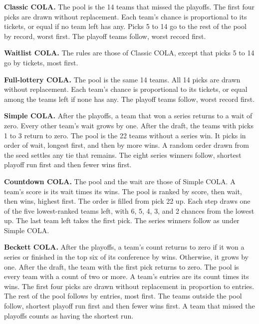 \documentclass[11pt,letterpaper]{article}
\begin{document}
\textbf{Classic COLA.} The pool is the 14 teams that missed the playoffs. The first four picks are drawn without replacement. Each team's chance is proportional to its tickets, or equal if no team left has any. Picks 5 to 14 go to the rest of the pool by record, worst first. The playoff teams follow, worst record first.

\textbf{Waitlist COLA.} The rules are those of Classic COLA, except that picks 5 to 14 go by tickets, most first.

\textbf{Full-lottery COLA.} The pool is the same 14 teams. All 14 picks are drawn without replacement. Each team's chance is proportional to its tickets, or equal among the teams left if none has any. The playoff teams follow, worst record first.

\textbf{Simple COLA.} After the playoffs, a team that won a series returns to a wait of zero. Every other team's wait grows by one. After the draft, the teams with picks 1 to 3 return to zero. The pool is the 22 teams without a series win. It picks in order of wait, longest first, and then by more wins. A random order drawn from the seed settles any tie that remains. The eight series winners follow, shortest playoff run first and then fewer wins first.

\textbf{Countdown COLA.} The pool and the wait are those of Simple COLA. A team's score is its wait times its wins. The pool is ranked by score, then wait, then wins, highest first. The order is filled from pick 22 up. Each step draws one of the five lowest-ranked teams left, with 6, 5, 4, 3, and 2 chances from the lowest up. The last team left takes the first pick. The series winners follow as under Simple COLA.

\textbf{Beckett COLA.} After the playoffs, a team's count returns to zero if it won a series or finished in the top six of its conference by wins. Otherwise, it grows by one. After the draft, the team with the first pick returns to zero. The pool is every team with a count of two or more. A team's entries are its count times its wins. The first four picks are drawn without replacement in proportion to entries. The rest of the pool follows by entries, most first. The teams outside the pool follow, shortest playoff run first and then fewer wins first. A team that missed the playoffs counts as having the shortest run.
\end{document}
